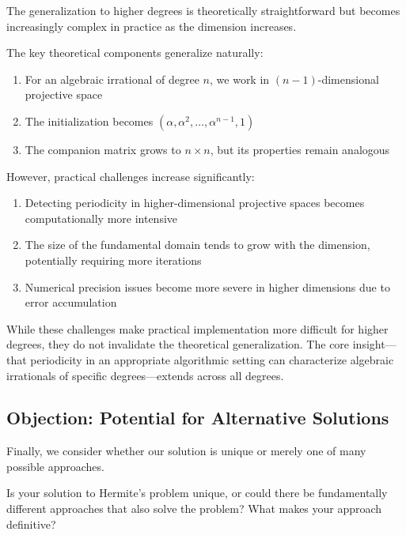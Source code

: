 \begin{response}
The generalization to higher degrees is theoretically straightforward but becomes increasingly complex in practice as the dimension increases.

The key theoretical components generalize naturally:
\begin{enumerate}
    \item For an algebraic irrational of degree $n$, we work in $(n-1)$-dimensional projective space
    \item The initialization becomes $(\alpha, \alpha^2, \ldots, \alpha^{n-1}, 1)$
    \item The companion matrix grows to $n \times n$, but its properties remain analogous
\end{enumerate}

However, practical challenges increase significantly:
\begin{enumerate}
    \item Detecting periodicity in higher-dimensional projective spaces becomes computationally more intensive
    \item The size of the fundamental domain tends to grow with the dimension, potentially requiring more iterations
    \item Numerical precision issues become more severe in higher dimensions due to error accumulation
\end{enumerate}

While these challenges make practical implementation more difficult for higher degrees, they do not invalidate the theoretical generalization. The core insight—that periodicity in an appropriate algorithmic setting can characterize algebraic irrationals of specific degrees—extends across all degrees.
\end{response}

\subsection{Objection: Potential for Alternative Solutions}

Finally, we consider whether our solution is unique or merely one of many possible approaches.

\begin{objection}
Is your solution to Hermite's problem unique, or could there be fundamentally different approaches that also solve the problem? What makes your approach definitive?
\end{objection}

